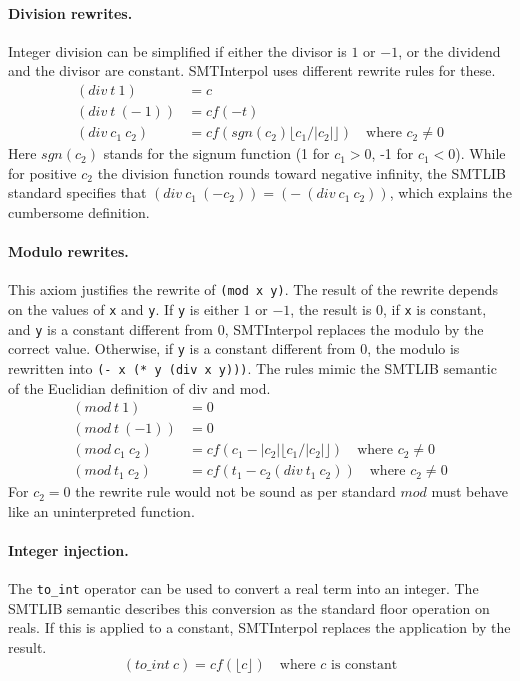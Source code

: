 \documentclass[a4paper]{article}
\newcommand\si{SMTInterpol\xspace}
\newcommand\cf{\mathit{cf}}
\begin{document}
\paragraph{Division rewrites.}  Integer division can be simplified if either
the divisor is $1$ or $-1$, or the dividend and the divisor are constant.  \si
uses different rewrite rules for these.
\begin{align}
  (div\ t\ 1) &= c \tag{div1}\\
  (div\ t\ (-\ 1)) &= \cf(-t) \tag{div-1} \\
  (div\ c_1\ c_2) &= \cf(sgn(c_2) \lfloor c_1/|c_2| \rfloor) \quad\text{where $c_2\neq 0$}\tag{divConst}
\end{align}
Here $sgn(c_2)$ stands for the signum function (1 for $c_1>0$, -1 for $c_1 < 0$).
While for positive $c_2$ the division function rounds toward negative
infinity, the SMTLIB standard specifies that $(div\ c_1\ (- c_2)) =
(-\ (div\ c_1\ c_2))$, which explains the cumbersome definition.


\paragraph{Modulo rewrites.}  This axiom justifies the rewrite of
\verb+(mod x y)+.  The result of the rewrite depends on the values of
\verb+x+ and \verb+y+.  If \verb+y+ is either $1$ or $-1$, the result is 0, if
\verb+x+ is constant, and \verb+y+ is a constant different from $0$, \si
replaces the modulo by the correct value.  Otherwise, if \verb+y+ is a
constant different from $0$, the modulo is rewritten into
\verb+(- x (* y (div x y)))+.  The rules mimic the SMTLIB semantic of the
Euclidian definition of div and mod.
\begin{align}
  (mod\ t\ 1) &= 0 \tag{div1}\\
  (mod\ t\ (- 1)) &= 0 \tag{div-1} \\
  (mod\ c_1\ c_2) &= \cf(c_1 - |c_2|\lfloor c_1/|c_2| \rfloor)
  \quad\text{where $c_2\neq 0$}
  \tag{moduloConst} \\
  (mod\ t_1\ c_2) &= \cf(t_1 - c_2 (div\ t_1\ c_2)) \quad\text{where $c_2\neq 0$} \tag{modulo}
\end{align}
For $c_2 = 0$ the rewrite rule would not be sound as per standard $mod$ must behave like an uninterpreted function.

\paragraph{Integer injection.}  The \verb+to_int+ operator can be used to
convert a real term into an integer.  The SMTLIB semantic describes this
conversion as the standard floor operation on reals.  If this is applied to a
constant, \si replaces the application by the result.
\begin{equation}
  (to\_int\ c) = \cf(\lfloor c \rfloor) \quad\text{where $c$ is constant} \tag{toInt}
\end{equation}
\end{document}
